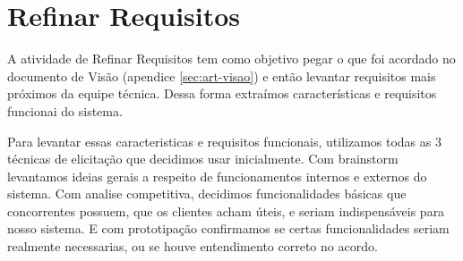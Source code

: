 \section{Refinar Requisitos}
\label{sec:refinar-req}

A atividade de Refinar Requisitos tem como objetivo pegar o que foi acordado no documento de Visão (apendice \ref{sec:art-visao}) e então levantar requisitos mais próximos da equipe técnica. Dessa forma extraímos características e requisitos funcionai do sistema.

Para levantar essas caracteristicas e requisitos funcionais, utilizamos todas as 3 técnicas de elicitação que decidimos usar inicialmente. Com brainstorm levantamos ideias gerais a respeito de funcionamentos internos e externos do sistema. Com analise competitiva, decidimos funcionalidades básicas que concorrentes possuem, que os clientes acham úteis, e seriam indispensáveis para nosso sistema. E com prototipação confirmamos se certas funcionalidades seriam realmente necessarias, ou se houve entendimento correto no acordo.

\label{sec:carac}

